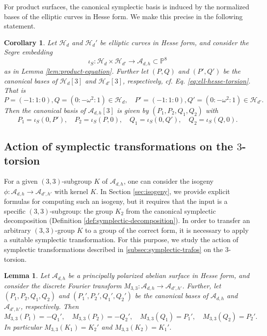\documentclass[11pt]{amsart}
\newtheorem{corollary}[theorem]{Corollary}
\newtheorem{lemma}[theorem]{Lemma}
\theoremstyle{definition}
\newcommand{\A}{\mathcal{A}}
\renewcommand{\H}{\mathcal{H}}
\newcommand{\HH}{\mathcal{H}}
\let \H\HH
\newcommand{\PP}{\mathbb{P}}
\newcommand{\DFT}{M_{3,3}}
\begin{document}
For product surfaces, the canonical symplectic basis is induced by the normalized bases of the elliptic curves in Hesse form. We make this precise in the following statement.
\begin{corollary} \label{cor:product-basis}
    Let $\H_d$ and $\H_d'$ be elliptic curves in Hesse form, and consider the Segre embedding
    \[
    \iota_S : \H_d \times \H_{d'} \to \A_{d,h} \subset \PP^8 
    \]
    as in Lemma \ref{lem:product-equation}. Further let $(P,Q)$ and $(P',Q')$ be the canonical bases of $\H_{d}[3]$ and $\H_{d'}[3]$, respectively, cf. Eq. \ref{eq:ell-hesse-torsion}. That is
    \[
    P = (-1:1:0), Q = (0:-\omega^2:1) \in \H_d,\quad P' = (-1:1:0), Q' = (0:-\omega^2:1) \in \H_{d'}.
    \]
    Then the canonical basis of $\A_{d,h}[3]$ is given by $(P_1,P_2,Q_1,Q_2)$ with
    \[
    P_1 = \iota_S(0, P'), \quad P_2 = \iota_S(P, 0), \quad Q_1 = \iota_S(0,Q'), \quad Q_2 = \iota_S(Q,0).
    \]
\end{corollary}

\subsection{Action of symplectic transformations on the $3$-torsion}
For a given $(3,3)$-subgroup $K$ of $\A_{d,h}$, one can consider the isogeny $\phi: \A_{d,h} \to \A_{d',h'}$ with kernel $K$. In Section \ref{sec:isogeny}, we provide explicit formulas for computing such an isogeny, but it requires that the input is a specific $(3,3)$-subgroup:  the group $K_2$ from the canonical symplectic decomposition (Definition \ref{def:symplectic-decomposition}). In order to transfer an arbitrary $(3,3)$-group $K$ to a group of the correct form, it is necessary to apply a suitable symplectic transformation. For this purpose, we study the action of symplectic transformations described in \ref{subsec:symplectic-trafos} on the $3$-torsion. 


\begin{lemma} \label{lem:DFT-3torsion}
	Let $\A_{d,h}$ be a principally polarized abelian surface in Hesse form, and consider the discrete Fourier transform $\DFT: \A_{d,h} \to \A_{d',h'}$. Further, let $(P_1,P_2,Q_1,Q_2)$ and $(P_1', P_2', Q_1', Q_2')$ be the canonical bases of $\A_{d,h}$ and $\A_{d',h'}$, respectively. Then
	\[
	\DFT(P_1) = - Q_1', \quad  \DFT(P_2) = - Q_2', \quad \DFT(Q_1) = P_1', \quad \DFT(Q_2) =  P_2'.
	\]
	In particular $\DFT(K_1) = K_2'$ and $\DFT(K_2) =  K_1'$.
\end{lemma}
\end{document}
